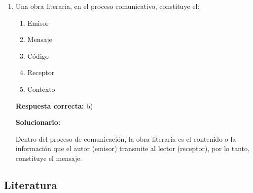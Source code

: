 \begin{enumerate}[resume]
El propósito comunicativo del texto es:

\begin{enumerate}[label=\alph*)]
	\item Advertir
	\item Convencer
	\item Deleitar
	\item Informar
	\item Mostrar
\end{enumerate}

\textbf{Respuesta correcta:} a)

\vspace{2mm}
\textbf{Solucionario:}

El texto tiene una función apelativa o exhortativa; su propósito es advertir y dar pautas de comportamiento o instrucciones necesarias para actuar ante una situación de emergencia.

\vspace{6mm}

\item Una obra literaria, en el proceso comunicativo, constituye el:

\begin{enumerate}[label=\alph*)]
	\item Emisor
	\item Mensaje
	\item Código
	\item Receptor
	\item Contexto
\end{enumerate}

\textbf{Respuesta correcta:} b)

\vspace{2mm}
\textbf{Solucionario:}

Dentro del proceso de comunicación, la obra literaria es el contenido o la información que el autor (emisor) transmite al lector (receptor), por lo tanto, constituye el mensaje.

\vspace{6mm}

\end{enumerate}


\subsection*{Literatura}

